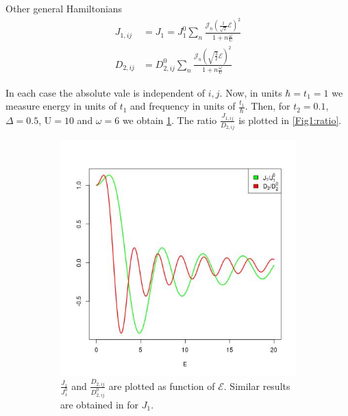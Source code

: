 \begin{section}{Other general Hamiltonians}
\begin{align}
J_{1,ij} &= J_{1} = J_{1}^0  \sum_{n} \frac{\mathcal{J}_n(\frac{1}{\sqrt{2}}\mathcal{E})^2}{1+n\frac{\omega}{\text{U}}} \\
D_{2,ij} &= D_{2,ij}^0  \sum_{n} \frac{\mathcal{J}_n(\sqrt{\frac{3}{2}}\mathcal{E})^2}{1+n\frac{\omega}{\text{U}}}
\end{align}

In each case the absolute vale is independent of $i,j$.  Now, in units $\hbar=t_1=1$ we measure energy in units of $t_1$ and frequency in units of $\frac{t_1}{\hbar}$. Then, for $t_2 = 0.1$, $\Delta = 0.5$, $\text{U} = 10$ and $\omega = 6$ we obtain \ref{Fig1:NNvsNNN}. The ratio $\frac{J_{1,ij}}{D_{2,ij}}$ is plotted in \ref{Fig1:ratio}.

\begin{figure}
\centering
\begin{subfigure}{.5\textwidth}
  \centering
  \includegraphics[width=1\linewidth]{Chapters/NNvsNNN.jpg}
  \caption{$\frac{J_{1}}{J_{1}^0}$ and $\frac{D_{2,ij}}{D_{2,ij}^0}$ are plotted as function of $\mathcal{E}$. Similar results are obtained in \cite{Mentink2015} for $J_{1}$.}
  \label{Fig1:NNvsNNN}
\end{subfigure}%
\begin{subfigure}{.5\textwidth}
  \centering

\end{subfigure}
\end{figure}
\end{section}
